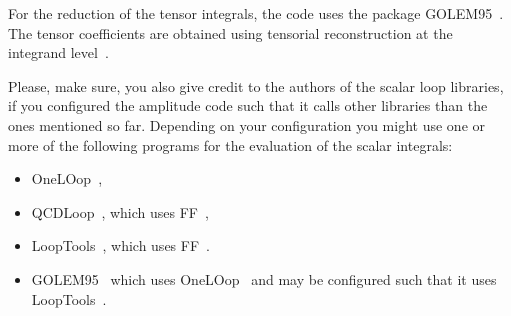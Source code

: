 \documentclass[a4paper]{article}
\begin{document}
For
the reduction of the tensor integrals, the code uses the
package GOLEM95~\cite{Guillet:2013msa,Binoth:2008uq,Cullen:2011kv}.
The tensor coefficients are
obtained using tensorial reconstruction at the integrand
level~\cite{Heinrich:2010ax}.

Please, make sure, you also give credit to the authors of the scalar
loop libraries, if you configured the amplitude code such that it calls
other libraries than the ones mentioned so far. Depending on your
configuration you might use one or more of the following programs for
the evaluation of the scalar integrals:
\begin{itemize}
\item OneLOop~\cite{vanHameren:2010cp},
\item QCDLoop~\cite{Ellis:2007qk}, which uses FF~\cite{vanOldenborgh:1990yc},
\item LoopTools~\cite{Hahn:1998yk}, which uses FF~\cite{vanOldenborgh:1990yc}.
\item GOLEM95~\cite{Binoth:2008uq,Guillet:2013msa} which uses OneLOop~\cite{vanHameren:2010cp}
   and may be configured such that it uses
   LoopTools~\cite{Hahn:1998yk,vanOldenborgh:1990yc}.
\end{itemize}
\end{document}
